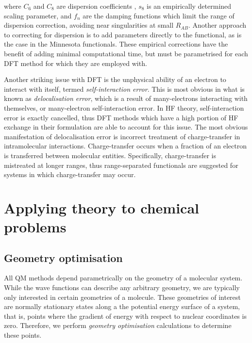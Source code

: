 \noindent where $C_6$ and $C_8$ are dispersion coefficients , $s_8$ is an
empirically determined scaling parameter, and $f_n$ are the damping functions
which limit the range of dispersion correction, avoiding near singularities at
small $R_{AB}$. Another approach to correcting for dispersion is to add
parameters directly to the functional, as is the case in the Minnesota
functionals.\cite{Zhao2006,Zhao2006} These empirical corrections have the
benefit of adding minimal computational time, but must be parametrised for each
DFT method for which they are employed with.

Another striking issue with DFT is the unphysical ability of an electron to
interact with itself, termed \emph{self-interaction error}. This is most obvious
in what is known as \emph{delocalisation error}, which is a result of
many-electrons interacting with themselves, or many-electron self-interaction
error. In HF theory, self-interaction error is exactly cancelled, thus DFT
methods which have a high portion of HF exchange in their formulation are able
to account for this issue. The most obvious manifestation of delocalisation
error is incorrect treatment of charge-transfer in intramolecular
interactions.\cite{MoriSanchez2008,OterodelaRoza2014} Charge-transfer occurs
when a fraction of an electron is transferred between molecular
entities. Specifically, charge-transfer is mistreated at longer ranges, thus
range-separated functionals are suggested for systems in which charge-transfer
may occur.

\section{Applying theory to chemical problems}

\subsection{Geometry optimisation}


All QM methods depend parametrically on the geometry of a molecular
system. While the wave functions can describe any arbitrary geometry, we are
typically only interested in certain geometries of a molecule. These geometries
of interest are normally stationary states along a the potential energy surface
of a system, that is, points where the gradient of energy with respect to
nuclear coordinates is zero. Therefore, we perform \emph{geometry optimisation}
calculations to determine these points.

